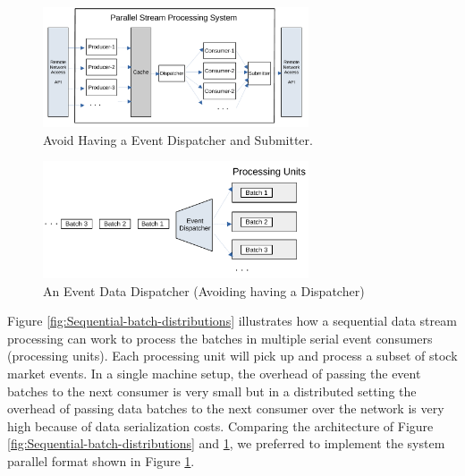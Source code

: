 \begin{figure}[]
    \begin{center}
        \includegraphics[width=0.7\textwidth]{./images/Parallel-Stream-Processing-System}
        \caption{Avoid Having a Event Dispatcher and Submitter.}
        \label{fig:parallel-srream-processing}
    \end{center}
\end{figure}


\begin{figure}[]
    \begin{center}
        \includegraphics[width=0.7\textwidth]{./images/Stream-Batch-Distributions}
        \caption{An Event Data Dispatcher (Avoiding having a Dispatcher)}
        \label{fig:batch-distributions}
    \end{center}
\end{figure}

Figure \ref{fig:Sequential-batch-distributions} illustrates how a sequential data stream processing can work to process the batches in multiple 
serial event consumers (processing units). Each processing unit will pick up and process a subset of stock market events. 
In a single machine setup, the overhead of passing the event batches to the next consumer is very small but in a distributed setting the 
overhead of passing data batches to the next consumer over the network is very high because of data serialization costs. Comparing the 
architecture of Figure \ref{fig:Sequential-batch-distributions} and \ref{fig:parallel-srream-processing}, we preferred to implement the system 
parallel format shown in Figure \ref{fig:parallel-srream-processing}. 

